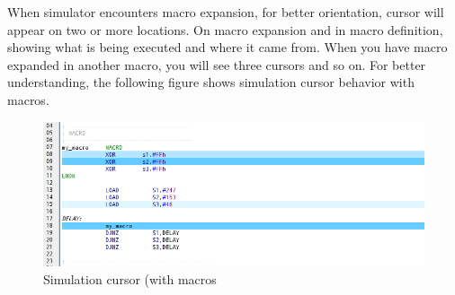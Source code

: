         When simulator encounters macro expansion, for better orientation, cursor will appear on two or more locations. On macro expansion and in macro definition, showing what is being executed and where it came from. When you have macro expanded in another macro, you will see three cursors and so on. For better understanding, the following figure shows simulation cursor behavior with macros.
        \begin{figure}[h!]
            \centering
            \includegraphics[width=\textwidth]{img/simulationcursor2.png}
            \caption{Simulation cursor (with macros}
        \end{figure}
